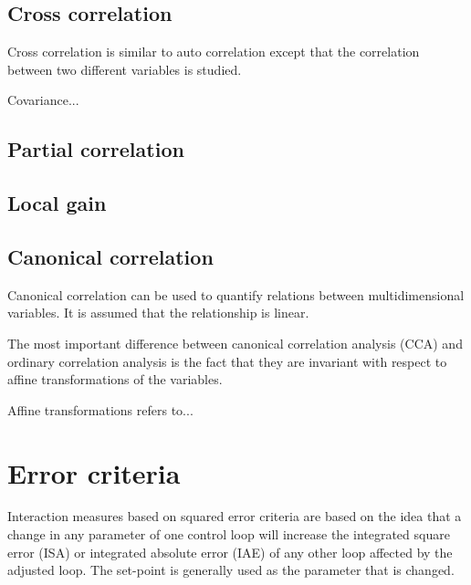 \subsection{Cross correlation}

Cross correlation is similar to auto correlation except that the correlation between two different variables is studied.

Covariance...

\subsection{Partial correlation}


\subsection{Local gain}



\subsection{Canonical correlation}

Canonical correlation can be used to quantify relations between multidimensional variables.
It is assumed that the relationship is linear.


The most important difference between canonical correlation analysis (CCA) and ordinary correlation analysis is the fact that they are invariant with respect to affine transformations of the variables.

Affine transformations refers to... %

\section{Error criteria}

Interaction measures based on squared error criteria are based on the idea that a change in any parameter of one control loop will increase the integrated square error (ISA) or integrated absolute error (IAE) of any other loop affected by the adjusted loop.
The set-point is generally used as the parameter that is changed.

